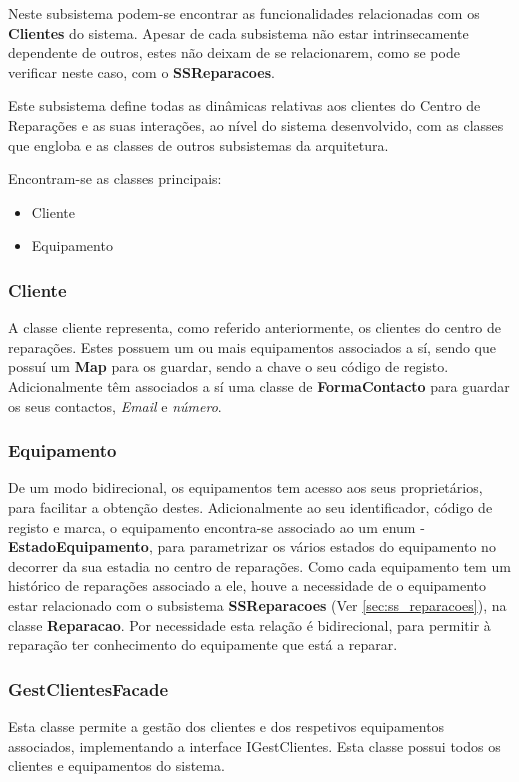 \documentclass[../../relatorio.tex]{subfiles}
\begin{document}
Neste subsistema podem-se encontrar as funcionalidades relacionadas com os \textbf{Clientes} do sistema. 
Apesar de cada subsistema não estar intrinsecamente dependente de outros, estes não deixam de 
se relacionarem, como se pode verificar neste caso, com o \textbf{SSReparacoes}.

Este subsistema define todas as dinâmicas relativas aos clientes do Centro de Reparações e as suas interações, ao
nível do sistema desenvolvido, com as classes que engloba e as classes de outros subsistemas da arquitetura.

Encontram-se as classes principais:
\begin{itemize}
    \item Cliente
    \item Equipamento
\end{itemize}

\subsubsection{Cliente}
A classe cliente representa, como referido anteriormente, os clientes do centro de reparações. 
Estes possuem um ou mais equipamentos associados a sí, sendo que possuí um \textbf{Map} para os guardar, sendo a
chave o seu código de registo.
Adicionalmente têm associados a sí uma classe de \textbf{FormaContacto} para guardar os seus contactos, 
\textit{Email} e \textit{número}.

\subsubsection{Equipamento}
De um modo bidirecional, os equipamentos tem acesso aos seus proprietários, para facilitar a obtenção destes.
Adicionalmente ao seu identificador, código de registo e marca, o equipamento encontra-se associado ao um enum -
\textbf{EstadoEquipamento}, para parametrizar os vários estados do equipamento no decorrer da sua estadia no centro de 
reparações.
Como cada equipamento tem um histórico de reparações associado a ele, houve a necessidade de o equipamento estar relacionado 
com o subsistema \textbf{SSReparacoes} (Ver \ref{sec:ss_reparacoes}), na classe \textbf{Reparacao}.
Por necessidade esta relação é bidirecional, para permitir à reparação ter conhecimento do equipamente que está a reparar.

\subsubsection{GestClientesFacade}
Esta classe permite a gestão dos clientes e dos respetivos equipamentos associados, implementando a interface IGestClientes.
Esta classe possui todos os clientes e equipamentos do sistema.
\end{document}
